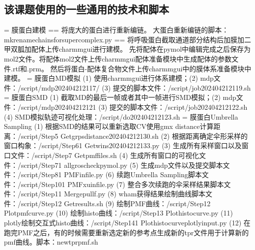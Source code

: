 \subsection{该课题使用的一些通用的技术和脚本}
\noindent = 膜蛋白建模
\newline == 将庞大的蛋白进行重新编链。
\newline\indent 大蛋白重新编链的脚本：mkrenamechainsforsupercomplex.py
\newline == 将呼吸蛋白截取通道部分结构后加膜加二甲双胍加配体上传charmmgui进行建模。
\newline\indent 先将配体在pymol中编辑完成之后保存为mol2文件。将配体mol2文件上传charmmgui配体准备模块中生成配体的参数文件.rtf和.prm。
然后将蛋白-配体复合物文件上传charmmgui中的膜体系准备模块中建模。
\newline\noindent = 膜蛋白MD模拟
\newline\indent (1) 使用charmmgui进行体系建模；(2) mdp文件：/script/mdp202404212117/ (3) 提交的脚本文件：/script/job202404212119.sh
\newline\noindent = 膜蛋白SMD
\newline\indent (1) 截取MD的最后一帧或者其中一帧进行SMD模拟；(2) mdp文件：/script/mdp202404212121 (3) 提交的脚本文件：/script/job202404212122.sh 
(4) SMD模拟轨迹可视化处理：/script/do202404212123.sh  
\newline\noindent = 膜蛋白Umbrella Sampling
\newline\indent (1) 根据SMD的结果可以重新选取CV使用gmx distance计算距离：/script/Step5 Getgrpsdistance202404212130.sh 
(2) 根据距离确定伞形采样的窗口构象：/script/Step61 Getwins202404212133.py 
(3) 生成所有采样窗口以及窗口文件：/script/Step7 Getpmffiles.sh 
(4) 生成所有窗口的可视化文件：/script/Step71 allgroscheckpymol.py 
(5) 生成mdp文件以及提交脚本文件：/script/Step81 PMFinfile.py 
(6) 续跑Umbrella Sampling脚本文件：/script/Step101 PMFxuinfile.py  
(7) 整合多次续跑的伞采样结果脚本文件：/script/Step11 Mergepullf.py 
(8) wham获得结果绘制曲线脚本文件：/script/Step12 Getresults.sh 
(9) 绘制PMF曲线：/script/Step12 Plotpmfcurve.py 
(10) 绘制histo曲线：/script/Step13 Plothistocurve.py 
(11) plotly绘制交互式histo曲线：/script/Step141 Plothistocurveplotlyinput.py
(12) 在跑完PMF之后，有的时候需要重新选定新的参考点生成新的tpr文件用于计算新的pmf曲线。脚本：newtprpmf.sh 
